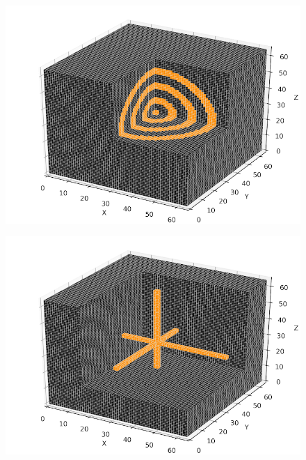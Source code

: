 \documentclass[fleqn,a4paper,oneside,openany]{book}
\begin{document}
\begin{figure}
\begin{minipage}[b]{145pt}
     \hspace{100pt}
   \end{minipage}
   \begin{minipage}[b]{145pt}
     \centering
     \includegraphics[trim = 0 0 0 0, clip, width=\linewidth] {phantom_figures/sphere.png}
     \label{fig:phantom_sphere}
     \hspace{100pt}
   \end{minipage}
   \begin{minipage}[b]{145pt}
     \centering
     \includegraphics[trim = 0 0 0 0, clip, width=\linewidth] {phantom_figures/pattern_1.png}
     \label{fig:phantom_pattern_1}
     \hspace{100pt}
   \end{minipage}

\end{figure}
\end{document}
